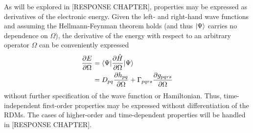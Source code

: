 As will be explored in [RESPONSE CHAPTER], properties may be expressed as derivatives of the electronic energy. Given the left- and right-hand wave functions and assuming the Hellmann-Feynman theorem holds (and thus $| \Psi \rangle$ carries no dependence on $\Omega$), the derivative of the energy with respect to an arbitrary operator $\Omega$ can be conveniently expressed
\begin{equation} \label{eq:dE}
    \begin{aligned}
    \frac{\partial E}{\partial \Omega} &= \langle\Psi |\frac{\partial \hat{H}}{\partial \Omega}| \Psi \rangle\\
                                  &= D_{pq}\frac{\partial h_{pq}}{\partial \Omega} + \Gamma_{pqrs}\frac{\partial g_{pqrs}}{\partial \Omega}
    \end{aligned}
\end{equation}
without further specification of the wave function or Hamiltonian. Thus, time-independent first-order properties may be expressed without differentiation of the RDMs. The cases of higher-order and time-dependent properties will be handled in [RESPONSE CHAPTER]. 
